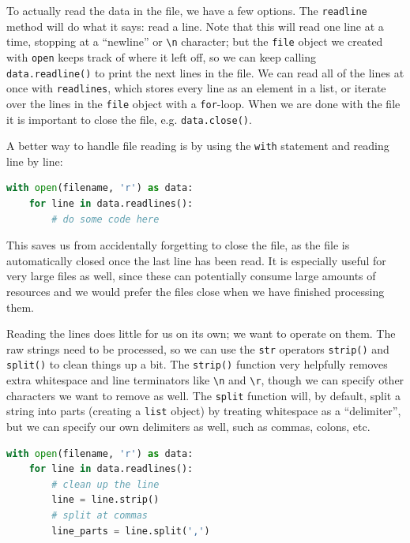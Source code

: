 \documentclass{tufte-book}
\begin{document}
To actually read the data in the file, we have a few options. The \verb|readline| method will do what it says: read a line. Note that this will read one line at a time, stopping at a ``newline'' or \verb|\n| character; but the \verb|file| object we created with \verb|open| keeps track of where it left off, so we can keep calling \verb|data.readline()| to print the next lines in the file. We can read all of the lines at once with \verb|readlines|, which stores every line as an element in a list, or iterate over the lines in the \verb|file| object with a \verb|for|-loop. When we are done with the file it is important to close the file, e.g. \verb|data.close()|.

A better way to handle file reading is by using the \verb|with| statement and reading line by line:

\begin{lstlisting}[language=Python, showstringspaces=false, backgroundcolor=\color{lightgray}]
with open(filename, 'r') as data:
    for line in data.readlines():
        # do some code here
\end{lstlisting}

\noindent This saves us from accidentally forgetting to close the file, as the file is automatically closed once the last line has been read. It is especially useful for very large files as well, since these can potentially consume large amounts of resources and we would prefer the files close when we have finished processing them.

Reading the lines does little for us on its own; we want to operate on them. The raw strings need to be processed, so we can use the \verb|str| operators \verb|strip()| and \verb|split()| to clean things up a bit. The \verb|strip()| function very helpfully removes extra whitespace and line terminators like \verb|\n| and \verb|\r|, though we can specify other characters we want to remove as well. The \verb|split| function will, by default, split a string into parts (creating a \verb|list| object) by treating whitespace as a ``delimiter'', but we can specify our own delimiters as well, such as commas, colons, etc.

\begin{lstlisting}[language=Python, showstringspaces=false, backgroundcolor=\color{lightgray}, breaklines=true]
with open(filename, 'r') as data:
    for line in data.readlines():
        # clean up the line
        line = line.strip()
        # split at commas
        line_parts = line.split(',')
\end{lstlisting}
\end{document}
